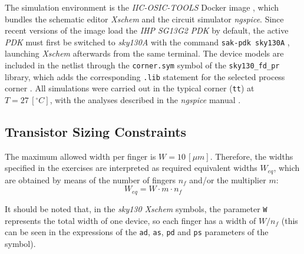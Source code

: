 \documentclass[12pt,a4paper]{article}
\begin{document}
The simulation environment is the \textit{IIC-OSIC-TOOLS} Docker image \cite{iic_osic_tools}, which bundles the schematic editor \textit{Xschem} and the circuit simulator \textit{ngspice}. Since recent versions of the image load the \textit{IHP SG13G2} \textit{PDK} by default, the active \textit{PDK} must first be switched to \textit{sky130A} with the command \texttt{sak-pdk sky130A} \cite{jku_ihp_tutorial}, launching \textit{Xschem} afterwards from the same terminal. The device models are included in the netlist through the \texttt{corner.sym} symbol of the \texttt{sky130\_fd\_pr} library, which adds the corresponding \texttt{.lib} statement for the selected process corner \cite{xschem_sky130}. All simulations were carried out in the typical corner (\texttt{tt}) at $T = 27 \, [^{\circ}C]$, with the analyses described in the \textit{ngspice} manual \cite{ngspice}.

\subsection{Transistor Sizing Constraints}                          \label{sec_1.1}
The maximum allowed width per finger is $W = 10 \, [\mu m]$. Therefore, the widths specified in the exercises are interpreted as required equivalent widths $W_{eq}$, which are obtained by means of the number of fingers $n_{f}$ and/or the multiplier $m$:
\begin{equation}
    W_{eq} = W \cdot m \cdot n_{f}
    \label{eq_1}
\end{equation}

It should be noted that, in the \textit{sky130 Xschem} symbols, the parameter \texttt{W} represents the total width of one device, so each finger has a width of $W/n_{f}$ (this can be seen in the expressions of the \texttt{ad}, \texttt{as}, \texttt{pd} and \texttt{ps} parameters of the symbol).
\end{document}
